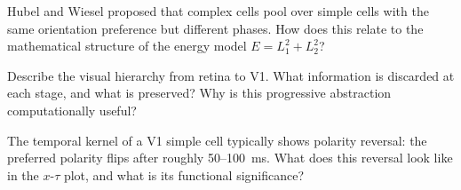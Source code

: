 \begin{conceptquestions}
  \item Hubel and Wiesel proposed that complex cells pool over simple cells with the same orientation preference but different phases. How does this relate to the mathematical structure of the energy model $E = L_1^2 + L_2^2$?

  \item Describe the visual hierarchy from retina to V1. What information is discarded at each stage, and what is preserved? Why is this progressive abstraction computationally useful?

  \item The temporal kernel of a V1 simple cell typically shows polarity reversal: the preferred polarity flips after roughly 50--100~ms. What does this reversal look like in the $x$-$\tau$ plot, and what is its functional significance?
\end{conceptquestions}
